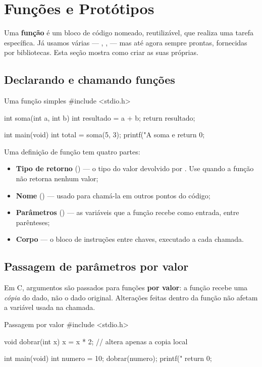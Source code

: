 \chapter{Funções e Protótipos}
\label{cap:funcoes}

Uma \textbf{função} é um bloco de código nomeado, reutilizável, que realiza uma tarefa específica. Já usamos várias — , ,  — mas até agora sempre prontas, fornecidas por bibliotecas. Esta seção mostra como criar as suas próprias.

\section{Declarando e chamando funções}

\begin{codigoc}{Uma função simples}
#include <stdio.h>

int soma(int a, int b) {
    int resultado = a + b;
    return resultado;
}

int main(void) {
    int total = soma(5, 3);
    printf("A soma e %
    return 0;
}
\end{codigoc}

Uma definição de função tem quatro partes:

\begin{itemize}
    \item \textbf{Tipo de retorno} () — o tipo do valor devolvido por . Use  quando a função não retorna nenhum valor;
    \item \textbf{Nome} () — usado para chamá-la em outros pontos do código;
    \item \textbf{Parâmetros} () — as variáveis que a função recebe como entrada, entre parênteses;
    \item \textbf{Corpo} — o bloco de instruções entre chaves, executado a cada chamada.
\end{itemize}

\section{Passagem de parâmetros por valor}

Em C, argumentos são passados para funções \textbf{por valor}: a função recebe uma \emph{cópia} do dado, não o dado original. Alterações feitas dentro da função não afetam a variável usada na chamada.

\begin{codigoc}{Passagem por valor}
#include <stdio.h>

void dobrar(int x) {
    x = x * 2;   // altera apenas a copia local
}

int main(void) {
    int numero = 10;
    dobrar(numero);
    printf("%
    return 0;
}
\end{codigoc}

